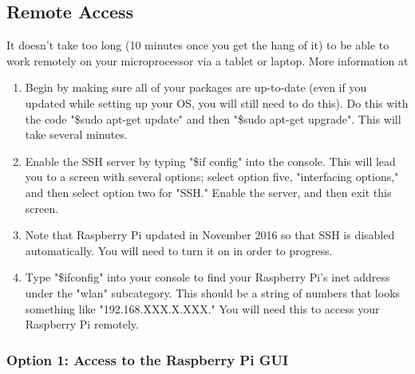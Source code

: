 \documentclass{article}\usepackage[]{graphicx}\usepackage[]{color}
\begin{document}
\subsection{Remote Access}

It doesn't take too long (10 minutes once you get the hang of it) to be able to work remotely on your microprocessor via a tablet or laptop.  More information at %

\begin{enumerate}

\item Begin by making sure all of your packages are up-to-date (even if you updated while setting up your OS, you will still need to do this).  Do this with the code "\$sudo apt-get update" and then "\$sudo apt-get upgrade".  This will take several minutes.
\item Enable the SSH server by typing "\$if config" into the console.  This will lead you to a screen with several options; select option five, "interfacing options," and then select option two for "SSH."  Enable the server, and then exit this screen.
\item Note that Raspberry Pi updated in November 2016 so that SSH is disabled automatically.  You will need to turn it on in order to progress.
\item Type "\$ifconfig" into your console to find your Raspberry Pi's inet address under the "wlan" subcategory.  This should be a string of numbers that looks something like "192.168.XXX.X.XXX."  You will need this to access your Raspberry Pi remotely.

\end{enumerate}

\subsubsection{Option 1: Access to the Raspberry Pi GUI}
\end{document}
